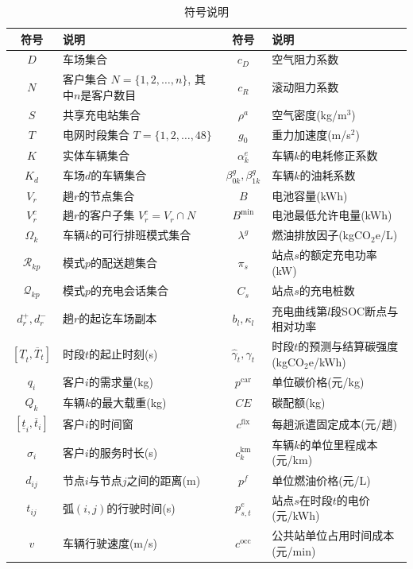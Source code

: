 \documentclass{setp-new}
\newcommand{\setpsymtabsetup}{\fontsize{9pt}{10.5pt}\selectfont\renewcommand{\arraystretch}{0.95}\setlength{\tabcolsep}{2.0pt}\setlength{\aboverulesep}{0.4pt}\setlength{\belowrulesep}{0.4pt}\hbadness=10000}
\begin{document}
\begin{table}[H]
\centering
\caption{符号说明}
\label{tab:symbols}
\setpsymtabsetup
\begin{tabular*}{\linewidth}{@{\extracolsep{\fill}}cJcJ@{}}
\toprule
符号 & 说明 & 符号 & 说明\\
\midrule
$D$ & 车场集合 & $c_D$ & 空气阻力系数\\
$N$ & 客户集合 $N=\{1,2,\dots,n\}$, 其中$n$是客户数目 & $c_R$ & 滚动阻力系数\\
$S$ & 共享充电站集合 & $\rho^a$ & 空气密度(kg/m$^3$)\\
$T$ & 电网时段集合 $T=\{1,2,\dots,48\}$ & $g_0$ & 重力加速度(m/s$^2$)\\
$K$ & 实体车辆集合 & $\alpha_k^e$ & 车辆$k$的电耗修正系数\\
$K_d$ & 车场$d$的车辆集合 & $\beta_{0k}^g,\beta_{1k}^g$ & 车辆$k$的油耗系数\\
$V_r$ & 趟$r$的节点集合 & $B$ & 电池容量(kWh)\\
$V_r^c$ & 趟$r$的客户子集 $V_r^c=V_r\cap N$ & $B^{\min}$ & 电池最低允许电量(kWh)\\
$\Omega_k$ & 车辆$k$的可行排班模式集合 & $\lambda^g$ & 燃油排放因子(kgCO$_2$e/L)\\
$\mathcal R_{kp}$ & 模式$p$的配送趟集合 & $\pi_s$ & 站点$s$的额定充电功率(kW)\\
$\mathcal Q_{kp}$ & 模式$p$的充电会话集合 & $C_s$ & 站点$s$的充电桩数\\
$d_r^+,d_r^-$ & 趟$r$的起讫车场副本 & $b_l,\kappa_l$ & 充电曲线第$l$段SOC断点与相对功率\\
$[\underline T_t,\overline T_t]$ & 时段$t$的起止时刻(s) & $\widehat\gamma_t,\gamma_t$ & 时段$t$的预测与结算碳强度(kgCO$_2$e/kWh)\\
$q_i$ & 客户$i$的需求量(kg) & $p^{\mathrm{car}}$ & 单位碳价格(元/kg)\\
$Q_k$ & 车辆$k$的最大载重(kg) & $CE$ & 碳配额(kg)\\
$[\underline t_i,\overline t_i]$ & 客户$i$的时间窗 & $c^{\mathrm{fix}}$ & 每趟派遣固定成本(元/趟)\\
$\sigma_i$ & 客户$i$的服务时长(s) & $c_k^{\mathrm{km}}$ & 车辆$k$的单位里程成本(元/km)\\
$d_{ij}$ & 节点$i$与节点$j$之间的距离(m) & $p^f$ & 单位燃油价格(元/L)\\
$t_{ij}$ & 弧$(i,j)$的行驶时间(s) & $p_{s,t}^{e}$ & 站点$s$在时段$t$的电价(元/kWh)\\
$v$ & 车辆行驶速度(m/s) & $c^{\mathrm{occ}}$ & 公共站单位占用时间成本(元/min)\\

\end{tabular*}
\end{table}
\end{document}
